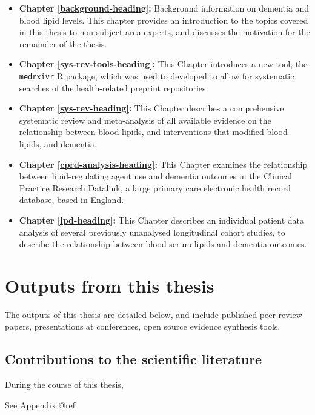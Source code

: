 \documentclass[a4paper, twoside]{templates/ociamthesis}
\providecommand{\tightlist}{%
  \setlength{\itemsep}{0pt}\setlength{\parskip}{0pt}}
\begin{document}
\begin{itemize}
\tightlist
\item
  \textbf{Chapter \ref{background-heading}:} Background information on dementia and blood lipid levels. This chapter provides an introduction to the topics covered in this thesis to non-subject area experts, and discusses the motivation for the remainder of the thesis.
\item
  \textbf{Chapter \ref{sys-rev-tools-heading}:} This Chapter introduces a new tool, the \texttt{medrxivr} R package, which was used to developed to allow for systematic searches of the health-related preprint repositories.
\item
  \textbf{Chapter \ref{sys-rev-heading}:} This Chapter describes a comprehensive systematic review and meta-analysis of all available evidence on the relationship between blood lipids, and interventions that modified blood lipids, and dementia.
\item
  \textbf{Chapter \ref{cprd-analysis-heading}:} This Chapter examines the relationship between lipid-regulating agent use and dementia outcomes in the Clinical Practice Research Datalink, a large primary care electronic health record database, based in England.
\item
  \textbf{Chapter \ref{ipd-heading}:} This Chapter describes an individual patient data analysis of several previously unanalysed longitudinal cohort studies, to describe the relationship between blood serum lipids and dementia outcomes.
\end{itemize}

\hypertarget{thesis-output}{%
\section{Outputs from this thesis}\label{thesis-output}}

The outputs of this thesis are detailed below, and include published peer review papers, presentations at conferences, open source evidence synthesis tools.

\hypertarget{contributions-to-the-scientific-literature}{%
\subsection{Contributions to the scientific literature}\label{contributions-to-the-scientific-literature}}

During the course of this thesis,

See Appendix @ref
\end{document}
